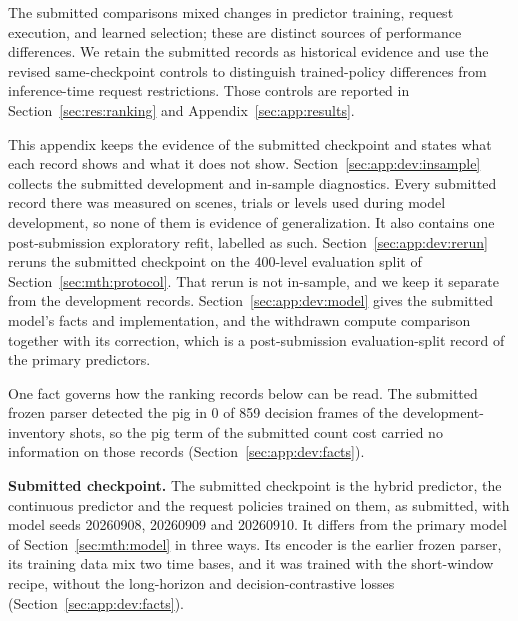 \begin{revblock}
The submitted comparisons mixed changes in predictor training, request execution, and learned selection; these are distinct sources of performance differences. We retain the submitted records as historical evidence and use the revised same-checkpoint controls to distinguish trained-policy differences from inference-time request restrictions. Those controls are reported in Section~\ref{sec:res:ranking} and Appendix~\ref{sec:app:results}.

This appendix keeps the evidence of the submitted checkpoint and states what each record shows and what it does not show. Section~\ref{sec:app:dev:insample} collects the submitted development and in-sample diagnostics. Every submitted record there was measured on scenes, trials or levels used during model development, so none of them is evidence of generalization. It also contains one post-submission exploratory refit, labelled as such. Section~\ref{sec:app:dev:rerun} reruns the submitted checkpoint on the 400-level evaluation split of Section~\ref{sec:mth:protocol}. That rerun is not in-sample, and we keep it separate from the development records. Section~\ref{sec:app:dev:model} gives the submitted model's facts and implementation, and the withdrawn compute comparison together with its correction, which is a post-submission evaluation-split record of the primary predictors.

One fact governs how the ranking records below can be read. The submitted frozen parser detected the pig in 0 of 859 decision frames of the development-inventory shots, so the pig term of the submitted count cost carried no information on those records (Section~\ref{sec:app:dev:facts}).

\textbf{Submitted checkpoint.} The submitted checkpoint is the hybrid predictor, the continuous predictor and the request policies trained on them, as submitted, with model seeds 20260908, 20260909 and 20260910. It differs from the primary model of Section~\ref{sec:mth:model} in three ways. Its encoder is the earlier frozen parser, its training data mix two time bases, and it was trained with the short-window recipe, without the long-horizon and decision-contrastive losses (Section~\ref{sec:app:dev:facts}).


\end{revblock}
